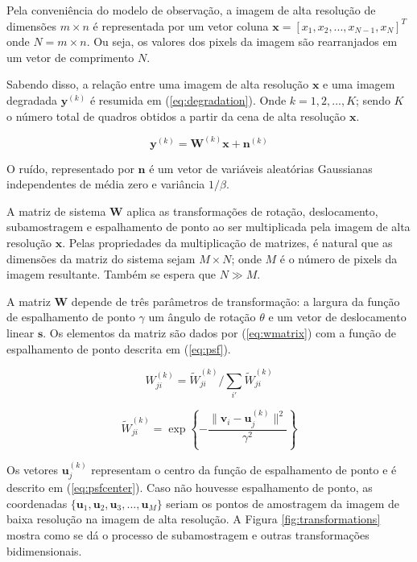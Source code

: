 \documentclass[12pt,openright,oneside,a4paper,english,brazil]{abntex2}
\begin{document}
Pela conveniência do modelo de observação, a imagem de alta resolução de dimensões $m \times n$ é representada por um vetor coluna $\mathbf{x} = [x_1, x_2, ... , x_{N-1}, x_N]^T$ onde $N ={} m \times n$. Ou seja, os valores dos pixels da imagem são rearranjados em um vetor de comprimento $N$.

Sabendo disso, a relação entre uma imagem de alta resolução $\mathbf{x}$ e uma imagem degradada $\mathbf{y}^{(k)}$ é resumida em (\ref{eq:degradation}). Onde $k = 1,2,...,K$; sendo $K$ o número total de quadros obtidos a partir da cena de alta resolução $\mathbf{x}$.

\begin{equation}
	\label{eq:degradation}
	\mathbf{y}^{(k)} = \mathbf{W}^{(k)}\mathbf{x} + \mathbf{n}^{(k)}
\end{equation}

O ruído, representado por $\mathbf{n}$ é um vetor de variáveis aleatórias Gaussianas independentes de média zero e variância $1/\beta$.

A matriz de sistema $\mathbf{W}$ aplica as transformações de rotação, deslocamento, subamostragem e espalhamento de ponto ao ser multiplicada pela imagem de alta resolução $\mathbf{x}$.
Pelas propriedades da multiplicação de matrizes, é natural que as dimensões da matriz do sistema sejam $M \times N$; onde $M$ é o número de pixels da imagem resultante.
Também se espera que $N \gg M$.

A matriz $\mathbf{W}$ depende de três parâmetros de transformação: a largura da função de espalhamento de ponto $\gamma$ um ângulo de rotação $\theta$ e um vetor de deslocamento linear $\mathbf{s}$. Os elementos da matriz são dados por (\ref{eq:wmatrix}) com a função de espalhamento de ponto descrita em (\ref{eq:psf}).

\begin{equation}
	\label{eq:wmatrix}
	W^{(k)}_{ji} = \widetilde{W}^{(k)}_{ji} / \sum_{i'} \widetilde{W}^{(k)}_{ji}
\end{equation}

\begin{equation}
	\label{eq:psf}
	\widetilde{W}^{(k)}_{ji} = \exp \left\{- \frac{\|\mathbf{v}_i - \mathbf{u}^{(k)}_j\|^2}{\gamma^2} \right\}
\end{equation}

Os vetores $\mathbf{u}^{(k)}_j$ representam o centro da função de espalhamento de ponto e é descrito em (\ref{eq:psfcenter}). Caso não houvesse espalhamento de ponto, as coordenadas $\{\mathbf{u}_1, \mathbf{u}_2,\mathbf{u}_3,..., \mathbf{u}_M\}$ seriam os pontos de amostragem da imagem de baixa resolução na imagem de alta resolução. A Figura \ref{fig:transformations} mostra como se dá o processo de subamostragem e outras transformações bidimensionais.
\end{document}
